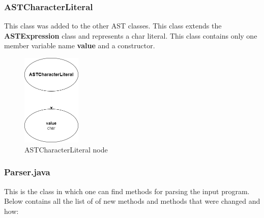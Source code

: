 \documentclass{article}
\begin{document}
				\subsubsection{ASTCharacterLiteral}
				
				This class was added to the other AST classes. This class extends the \textbf{ASTExpression} class and represents a char literal. This class contains only one member variable name \textbf{value} and a constructor.
				
				\begin{figure}[H]
					\centering
			 			\includegraphics[width=0.25\textwidth]{ASTCharLiteral.png}
			  			\caption{ASTCharacterLiteral node}
			  			\label{fig:astcharlit}
					\end{figure}
					
									\subsubsection{Parser.java}
				
				This is the class in which one can find methods for parsing the input program. Below contains all the list of of new methods and  methods that were changed and how:
				
\end{document}

